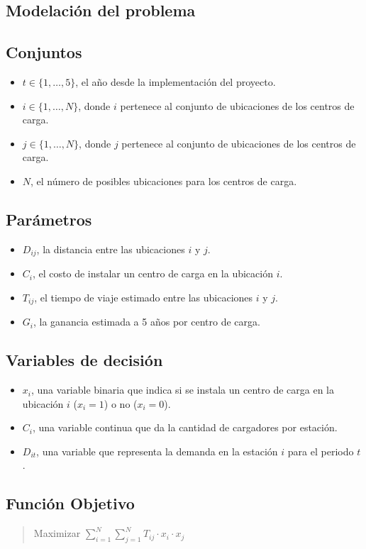 \documentclass[letterpaper]{article}
\begin{document}
\begin{flushleft}
		\section{Modelación del problema}
		\subsection{Conjuntos}
		\begin{itemize}
			\item $t \in \{1, \ldots, 5\}$, el año desde la implementación del proyecto.
			\item $i \in \{1, \ldots, N\}$, donde $i$ pertenece al conjunto de ubicaciones de los centros de carga.
			\item $j \in \{1, \ldots, N\}$, donde $j$ pertenece al conjunto de ubicaciones de los centros de carga.
			\item $N$, el número de posibles ubicaciones para los centros de carga.
		\end{itemize}
		
		\subsection{Parámetros}
		\begin{itemize}
			\item $D_{ij}$, la distancia entre las ubicaciones $i$ y $j$.
			\item $C_i$, el costo de instalar un centro de carga en la ubicación $i$.
			\item $T_{ij}$, el tiempo de viaje estimado entre las ubicaciones $i$ y $j$.
			\item $G_i$, la ganancia estimada a 5 años por centro de carga.
		\end{itemize}
		\subsection{Variables de decisión} 
		\begin{itemize}
			\item $x_i$, una variable binaria que indica si se instala un centro de carga en la ubicación $i$ ($x_i = 1$) o no ($x_i = 0$).
			\item $C_i$, una variable continua que da la cantidad de cargadores por estación.
			\item $D_{it}$, una variable que representa la demanda en la estación $i$ para el periodo $t$.
		\end{itemize}
		\subsection{Función Objetivo}
		\begin{quote}
			\begin{center}
				Maximizar $\sum_{i=1}^{N}\sum_{j=1}^{N} T_{ij} \cdot x_i \cdot x_j$
			\end{center}
		\end{quote}

\end{flushleft}
\end{document}
